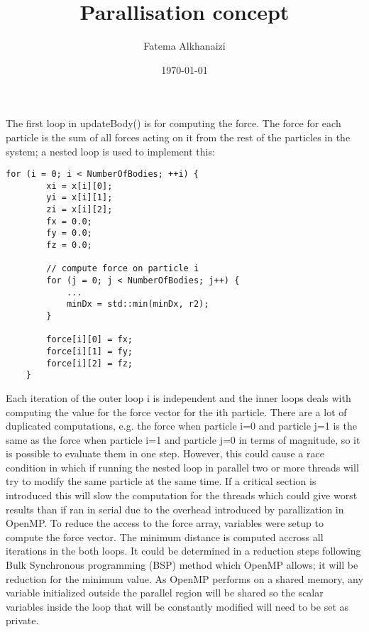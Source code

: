 \documentclass[11pt]{article}
\title{Parallisation concept}
\author{Fatema Alkhanaizi}
\date{\today}
\begin{document}
    \maketitle
    The first loop in updateBody() is for computing the force. The force for each particle is the sum of all forces acting on it from the rest of the particles in the system; a nested loop is used to implement this:
    \begin{lstlisting}[style=CStyle]
    for (i = 0; i < NumberOfBodies; ++i) {
        xi = x[i][0];
        yi = x[i][1];
        zi = x[i][2];
        fx = 0.0;
        fy = 0.0;
        fz = 0.0;

        // compute force on particle i
        for (j = 0; j < NumberOfBodies; j++) {
            ...
            minDx = std::min(minDx, r2);
        }

        force[i][0] = fx;
        force[i][1] = fy;
        force[i][2] = fz;
    }
    \end{lstlisting}
    Each iteration of the outer loop i is independent and the inner loops deals with computing the value for the force vector for the ith particle. There are a lot of duplicated computations, e.g. the force when  particle i=0 and particle j=1 is the same as the force when particle i=1 and particle j=0 in terms of magnitude, so it is possible to evaluate them in one step. However, this could cause a race condition in which if running the nested loop in parallel two or more threads will try to modify the same particle at the same time. If a critical section is introduced this will slow the computation for the threads which could give worst results than if ran in serial due to the overhead introduced by parallization in OpenMP. To reduce the access to the force array, variables were setup to compute the force vector. The minimum distance is computed accross all iterations in the both loops. It could be determined in a reduction steps following Bulk Synchronous programming (BSP) method which OpenMP allows; it will be reduction for the minimum value. As OpenMP performs on a shared memory, any variable initialized outside the parallel region will be shared so the scalar variables inside the loop that will be constantly modified will need to be set as private. 
    
\end{document}
